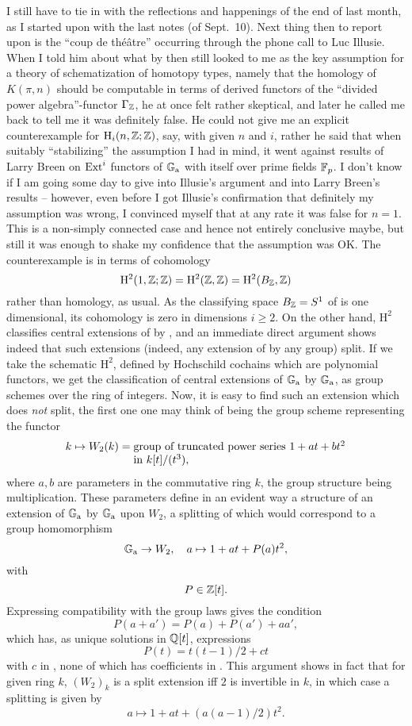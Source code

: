 I still have to tie in with the reflections and happenings of the end
of last month, as I started upon with the last notes (of
Sept.~10). Next thing then to report upon is the ``coup de
théâtre''
occurring through the phone call to Luc Illusie. When I told him about
what by then still looked to me as the key assumption for a theory of
schematization of homotopy types, namely that the homology of
$K(\pi,n)$ should be computable in terms of derived functors of the
``divided power algebra''-functor $\Gamma_{\mathbb{Z}}$, he at once felt rather
skeptical, and later he called me back to tell me it was definitely
false. He could not give me an explicit counterexample for $\mathrm
H_i(n,{\mathbb{Z}};{\mathbb{Z}})$, say, with given $n$ and $i$, rather he said that when
suitably ``stabilizing'' the assumption I had in mind, it went against
results of Larry Breen on $\operatorname{Ext}^i$ functors of ${\mathbb{G}}_{\mathrm{a}}$ with itself
over prime fields ${\mathbb{F}}_p$. I don't know if I am going some day to give
into Illusie's argument and into Larry Breen's results -- however,
even before I got Illusie's confirmation that definitely my assumption
was wrong, I convinced myself that at any rate it was false for
$n=1$. This is a non-simply connected case and hence not
entirely conclusive maybe, but still it was enough to shake my
confidence that the assumption was OK. The counterexample is in terms
of cohomology
\[\mathrm H^2(1,{\mathbb{Z}};{\mathbb{Z}})=\mathrm H^2({\mathbb{Z}},{\mathbb{Z}}) = \mathrm
  H^2(B_{\mathbb{Z}},{\mathbb{Z}})\]
rather than homology, as usual. As the classifying space $B_{\mathbb{Z}}=S^1$
of \bZ{} is one dimensional, its cohomology is zero in dimensions
$i\ge2$. On the other hand, $\mathrm H^2$ classifies central
extensions of \bZ{} by \bZ, and an immediate direct argument shows
indeed that such extensions (indeed, any extension of \bZ{} by any
group) split. If we take the schematic $\mathrm H^2$, defined by
Hochschild cochains which are polynomial functors, we get the
classification of central extensions of ${\mathbb{G}}_{\mathrm{a}}$ by ${\mathbb{G}}_{\mathrm{a}}$, as
group schemes over the ring of integers. Now, it is easy to find such
an extension which does \emph{not} split, the first one one may think
of being the group scheme representing the functor
\[k\mapsto W_2(k) =
  \begin{tabular}[t]{@{}l@{}}
    group of truncated power series $1+at+bt^2$ \\
    in $k[t]/(t^3)$,
  \end{tabular}\]
where $a,b$ are parameters in the commutative ring $k$, the group
structure being multiplication. These parameters define in an evident
way a structure of an extension of ${\mathbb{G}}_{\mathrm{a}}$ by ${\mathbb{G}}_{\mathrm{a}}$ upon
$W_2$, a splitting of which would correspond to a group homomorphism
\[{\mathbb{G}}_{\mathrm{a}} \to W_2, \quad a\mapsto 1+at+P(a)t^2,\]
with
\[P\in {\ensuremath{\mathbb{Z}}}[t].\]
Expressing compatibility with the group laws gives the condition
\[P(a+a') = P(a)+P(a')+aa',\]
which has, as unique solutions in ${\mathbb{Q}}[t]$, expressions
\[P(t)=t(t-1)/2 + ct\]
with $c$ in \bQ, none of which has coefficients in \bZ. This argument
shows in fact that for given ring $k$, $(W_2)_k$ is a split extension
if{f} $2$ is invertible in $k$, in which case a splitting is given by
\[a\mapsto 1+at+(a(a-1)/2)t^2.\]

